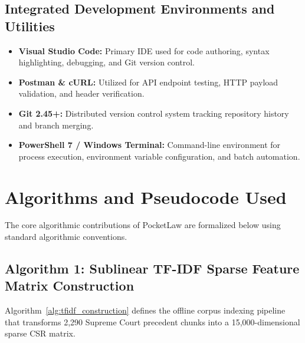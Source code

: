 \subsection{Integrated Development Environments and Utilities}
\begin{itemize}
    \item \textbf{Visual Studio Code:} Primary IDE used for code authoring, syntax highlighting, debugging, and Git version control.
    \item \textbf{Postman \& cURL:} Utilized for API endpoint testing, HTTP payload validation, and header verification.
    \item \textbf{Git 2.45+:} Distributed version control system tracking repository history and branch merging.
    \item \textbf{PowerShell 7 / Windows Terminal:} Command-line environment for process execution, environment variable configuration, and batch automation.
\end{itemize}

\section{Algorithms and Pseudocode Used}
\label{sec:algorithms}

The core algorithmic contributions of PocketLaw are formalized below using standard algorithmic conventions.

\subsection{Algorithm 1: Sublinear TF-IDF Sparse Feature Matrix Construction}
Algorithm~\ref{alg:tfidf_construction} defines the offline corpus indexing pipeline that transforms 2,290 Supreme Court precedent chunks into a 15,000-dimensional sparse CSR matrix.

